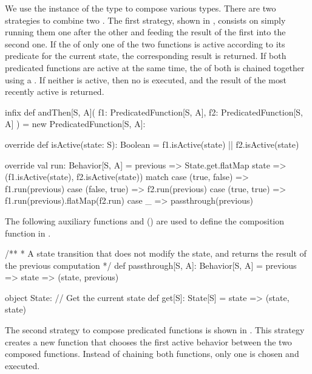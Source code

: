 We use the  instance of the  type to compose various  
types. There are two strategies to combine two . The first strategy, shown 
in , consists on simply running them one after the other and 
feeding the result of the first into the second one. If the  of only one of the two 
functions is active according to its predicate for the current state, the corresponding result is returned. 
If both predicated functions are active at the same time, the  of both is chained 
together using a . If neither is active, then no  is executed, and the 
result of the most recently active  is returned.

\begin{scala}[label=lst:predicated-function-andThen, caption=Sequential Composition of Predicated Functions]
infix def andThen[S, A](
    f1: PredicatedFunction[S, A],
    f2: PredicatedFunction[S, A]
) = new PredicatedFunction[S, A]:

  override def isActive(state: S): Boolean =
    f1.isActive(state) || f2.isActive(state)

  override val run: Behavior[S, A] = previous =>
    State.get.flatMap { state =>
      (f1.isActive(state), f2.isActive(state)) match
        case (true, false) => f1.run(previous)
        case (false, true) => f2.run(previous)
        case (true, true)  => f1.run(previous).flatMap(f2.run)
        case _             => passthrough(previous)
    }
\end{scala}

The following auxiliary functions  and  
() are used to define the composition function in 
.

\begin{scala}[label=lst:predicated-function-andThen-aux, caption=Auxiliary functions to implement Predicated Functions]
/**
* A state transition that does not modify the state, and returns the result of the previous computation
*/
def passthrough[S, A]: Behavior[S, A] =
  previous => state => (state, previous)

object State:
  // Get the current state
  def get[S]: State[S] = state => (state, state)
\end{scala}

The second strategy to compose predicated functions is shown in . 
This strategy creates a new function that chooses the first active behavior between the two composed 
functions. Instead of chaining both functions, only one  is chosen and executed.

